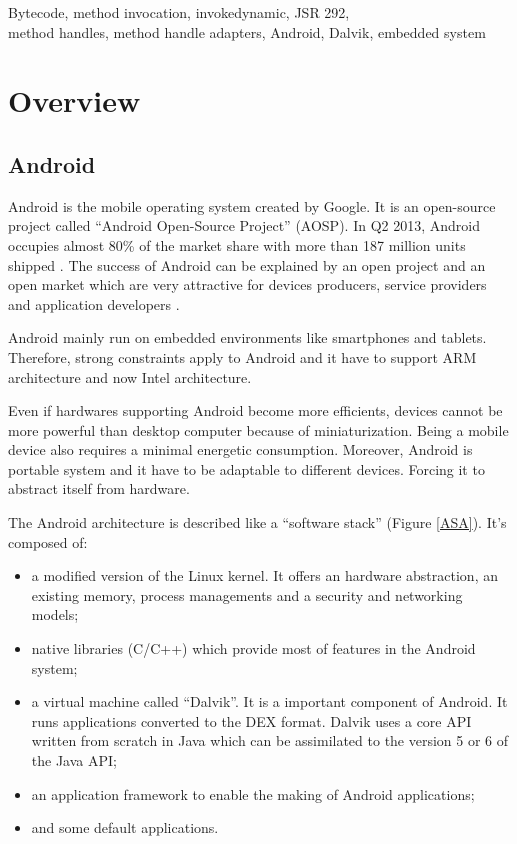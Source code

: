 \documentclass{sig-alternate}
\def \DALVIK{Dalvik\xspace}
\def \ANDROID{Android\xspace}
\def \DEX{DEX\xspace}
\begin{document}


\keywords
Bytecode, method invocation, invokedynamic, JSR 292,\\
method handles, method handle adapters, Android, Dalvik, embedded system

\section{Overview}

  \subsection{Android}

    \ANDROID is the mobile operating system created by Google.
    It is an open-source project called ``\ANDROID Open-Source Project'' (AOSP).
    In Q2 2013, \ANDROID occupies almost 80\% of the market share with more than 187 million units shipped \cite{idc-website}.
    The success of \ANDROID can be explained by an open project and an open market
    which are very attractive for devices producers, service providers and application developers \cite{ieee-butler-android-landscape}\cite{ieee-paulson-shift-dynamic-languages}.

    \ANDROID mainly run on embedded environments like smartphones and tablets.
    Therefore, strong constraints apply to \ANDROID
    and it have to support ARM architecture and now Intel architecture.
    
    Even if hardwares supporting \ANDROID become more efficients,
    devices cannot be more powerful than desktop computer because of miniaturization.
    Being a mobile device also requires a minimal energetic consumption.
    Moreover, \ANDROID is portable system and it have to be adaptable to different devices.
    Forcing it to abstract itself from hardware.

    The \ANDROID architecture is described like a ``software stack'' (Figure \ref{ASA}).
    It's composed of:
    \begin{itemize}
      \item a modified version of the Linux kernel.
        It offers an hardware abstraction, an existing memory, process managements and a security and networking models;
      \item native libraries (C/C++)
        which provide most of features in the \ANDROID system;
      \item a virtual machine called ``\DALVIK''.
        It is a important component of \ANDROID.
        It runs applications converted to the \DEX format.
        \DALVIK uses a core API written from scratch in Java
        which can be assimilated to the version 5 or 6 of the Java API;
      \item an application framework to enable the making of \ANDROID applications;
      \item and some default applications.
    \end{itemize}
\end{document}
